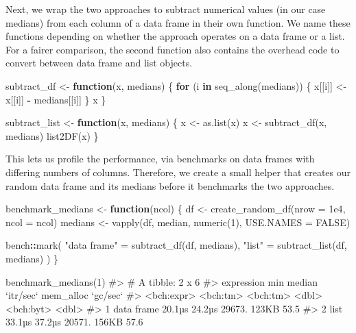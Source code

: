 \documentclass[
]{krantz}
\makeatletter
\newenvironment{Shaded}{\begin{snugshade}}{\end{snugshade}}
\newcommand{\CommentTok}[1]{\textcolor[rgb]{0.56,0.35,0.01}{\textit{#1}}}
\newcommand{\ControlFlowTok}[1]{\textcolor[rgb]{0.13,0.29,0.53}{\textbf{#1}}}
\newcommand{\DataTypeTok}[1]{\textcolor[rgb]{0.13,0.29,0.53}{#1}}
\newcommand{\DecValTok}[1]{\textcolor[rgb]{0.00,0.00,0.81}{#1}}
\newcommand{\FloatTok}[1]{\textcolor[rgb]{0.00,0.00,0.81}{#1}}
\newcommand{\KeywordTok}[1]{\textcolor[rgb]{0.13,0.29,0.53}{\textbf{#1}}}
\newcommand{\NormalTok}[1]{#1}
\newcommand{\OperatorTok}[1]{\textcolor[rgb]{0.81,0.36,0.00}{\textbf{#1}}}
\newcommand{\OtherTok}[1]{\textcolor[rgb]{0.56,0.35,0.01}{#1}}
\newcommand{\StringTok}[1]{\textcolor[rgb]{0.31,0.60,0.02}{#1}}
\newenvironment{kframe}{%
\medskip{}
\setlength{\fboxsep}{.8em}
 \def\at@end@of@kframe{}%
 \ifinner\ifhmode%
  \def\at@end@of@kframe{\end{minipage}}%
  \begin{minipage}{\columnwidth}%
 \fi\fi%
 \def\FrameCommand##1{\hskip\@totalleftmargin \hskip-\fboxsep
 \colorbox{shadecolor}{##1}\hskip-\fboxsep
     \hskip-\linewidth \hskip-\@totalleftmargin \hskip\columnwidth}%
 \MakeFramed {\advance\hsize-\width
   \@totalleftmargin\z@ \linewidth\hsize
   \@setminipage}}%
 {\par\unskip\endMakeFramed%
 \at@end@of@kframe}
\renewenvironment{Shaded}{\begin{kframe}}{\end{kframe}}
\renewcommand{\KeywordTok} [1]{\textcolor[rgb]{0.00,0.44,0.13}{{#1}}}
\renewcommand{\DataTypeTok}[1]{\textcolor[rgb]{0.56,0.13,0.00}{{#1}}}
\renewcommand{\DecValTok}  [1]{\textcolor[rgb]{0.25,0.63,0.44}{{#1}}}
\renewcommand{\FloatTok}   [1]{\textcolor[rgb]{0.25,0.63,0.44}{{#1}}}
\renewcommand{\StringTok}  [1]{\textcolor[rgb]{0.25,0.44,0.63}{{#1}}}
\renewcommand{\CommentTok} [1]{\textcolor[rgb]{0.38,0.63,0.69}{{#1}}}
\renewcommand{\OtherTok}   [1]{\textcolor[rgb]{0.00,0.44,0.13}{{#1}}}
\renewcommand{\NormalTok}  [1]{{#1}}
\makeatother
\begin{document}
Next, we wrap the two approaches to subtract numerical values (in our case medians) from each column of a data frame in their own function. We name these functions depending on whether the approach operates on a data frame or a list. For a fairer comparison, the second function also contains the overhead code to convert between data frame and list objects.

\begin{Shaded}
\begin{Highlighting}[]
\NormalTok{subtract_df <-}\StringTok{ }\ControlFlowTok{function}\NormalTok{(x, medians) \{}
  \ControlFlowTok{for}\NormalTok{ (i }\ControlFlowTok{in} \KeywordTok{seq_along}\NormalTok{(medians)) \{}
\NormalTok{    x[[i]] <-}\StringTok{ }\NormalTok{x[[i]] }\OperatorTok{-}\StringTok{ }\NormalTok{medians[[i]]}
\NormalTok{  \}}
\NormalTok{  x}
\NormalTok{\}}

\NormalTok{subtract_list <-}\StringTok{ }\ControlFlowTok{function}\NormalTok{(x, medians) \{}
\NormalTok{  x <-}\StringTok{ }\KeywordTok{as.list}\NormalTok{(x)}
\NormalTok{  x <-}\StringTok{ }\KeywordTok{subtract_df}\NormalTok{(x, medians)}
  \KeywordTok{list2DF}\NormalTok{(x)}
\NormalTok{\}}
\end{Highlighting}
\end{Shaded}

This lets us profile the performance, via benchmarks on data frames with differing numbers of columns. Therefore, we create a small helper that creates our random data frame and its medians before it benchmarks the two approaches.

\begin{Shaded}
\begin{Highlighting}[]
\NormalTok{benchmark_medians <-}\StringTok{ }\ControlFlowTok{function}\NormalTok{(ncol) \{}
\NormalTok{  df <-}\StringTok{ }\KeywordTok{create_random_df}\NormalTok{(}\DataTypeTok{nrow =} \FloatTok{1e4}\NormalTok{, }\DataTypeTok{ncol =}\NormalTok{ ncol)}
\NormalTok{  medians <-}\StringTok{ }\KeywordTok{vapply}\NormalTok{(df, median, }\KeywordTok{numeric}\NormalTok{(}\DecValTok{1}\NormalTok{), }\DataTypeTok{USE.NAMES =} \OtherTok{FALSE}\NormalTok{)}

\NormalTok{  bench}\OperatorTok{::}\KeywordTok{mark}\NormalTok{(}
    \StringTok{"data frame"}\NormalTok{ =}\StringTok{ }\KeywordTok{subtract_df}\NormalTok{(df, medians),}
    \StringTok{"list"}\NormalTok{ =}\StringTok{ }\KeywordTok{subtract_list}\NormalTok{(df, medians)}
\NormalTok{  )}
\NormalTok{\}}

\KeywordTok{benchmark_medians}\NormalTok{(}\DecValTok{1}\NormalTok{)}
\CommentTok{#> # A tibble: 2 x 6}
\CommentTok{#>   expression      min   median `itr/sec` mem_alloc `gc/sec`}
\CommentTok{#>   <bch:expr> <bch:tm> <bch:tm>     <dbl> <bch:byt>    <dbl>}
\CommentTok{#> 1 data frame   20.1µs   24.2µs    29673.     123KB     53.5}
\CommentTok{#> 2 list         33.1µs   37.2µs    20571.     156KB     57.6}
\end{Highlighting}
\end{Shaded}
\end{document}
